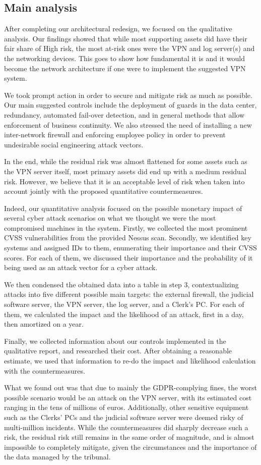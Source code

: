 \subsection{Main analysis}

After completing our architectural redesign, we focused on the qualitative analysis. Our findings showed that while most supporting assets did have their fair share of High risk, the most at-risk ones were the VPN and log server(s) and the networking devices. This goes to show how fundamental it is and it would become the network architecture if one were to implement the suggested VPN system.

We took prompt action in order to secure and mitigate risk as much as possible. Our main suggested controls include the deployment of guards in the data center, redundancy, automated fail-over detection, and in general methods that allow enforcement of business continuity. We also stressed the need of installing a new inter-network firewall and enforcing employee policy in order to prevent undesirable social engineering attack vectors.

In the end, while the residual risk was almost flattened for some assets such as the VPN server itself, most primary assets did end up with a medium residual risk. However, we believe that it is an acceptable level of risk when taken into account jointly with the proposed quantitative countermeasures.

Indeed, our quantitative analysis focused on the possible monetary impact of several cyber attack scenarios on what we thought we were the most compromised machines in the system. Firstly, we collected the most prominent CVSS vulnerabilities from the provided Nessus scan. Secondly, we identified key systems and assigned IDs to them, enumerating their importance and their CVSS scores. For each of them, we discussed their importance and the probability of it being used as an attack vector for a cyber attack.

We then condensed the obtained data into a table in step 3, contextualizing attacks into five different possible main targets: the external firewall, the judicial software server, the VPN server, the log server, and a Clerk's PC. For each of them, we calculated the impact and the likelihood of an attack, first in a day, then amortized on a year.

Finally, we collected information about our controls implemented in the qualitative report, and researched their cost. After obtaining a reasonable estimate, we used that information to re-do the impact and likelihood calculation with the countermeasures.

What we found out was that due to mainly the GDPR-complying fines, the worst possible scenario would be an attack on the VPN server, with its estimated cost ranging in the tens of millions of euros. Additionally, other sensitive equipment such as the Clerks' PCs and the judicial software server were deemed risky of multi-million incidents. While the countermeasures did sharply decrease such a risk, the residual risk still remains in the same order of magnitude, and is almost impossible to completely mitigate, given the circumstances and the importance of the data managed by the tribunal.

\clearpage